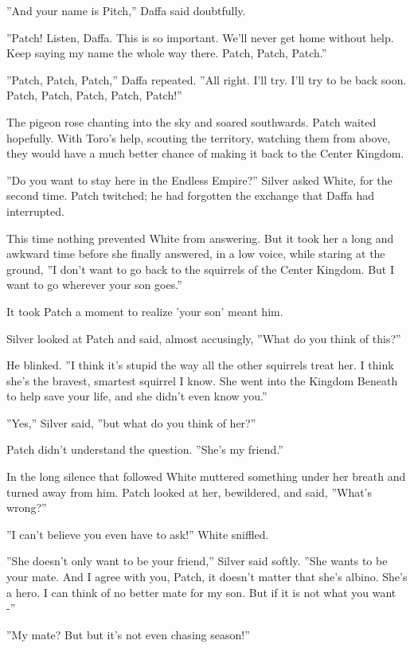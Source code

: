 \documentclass[12pt]{book}
\begin{document}
''And your name is Pitch,'' Daffa said doubtfully.\par
''Patch! Listen, Daffa. This is so important. We'll never get home without help. Keep saying my name the whole way there. Patch, Patch, Patch.''\par
''Patch, Patch, Patch,'' Daffa repeated. ''All right. I'll try. I'll try to be back soon. Patch, Patch, Patch, Patch, Patch!''\par
The pigeon rose chanting into the sky and soared southwards. Patch waited hopefully. With Toro's help, scouting the territory, watching them from above, they would have a much better chance of making it back to the Center Kingdom.\par
''Do you want to stay here in the Endless Empire?'' Silver asked White, for the second time. Patch twitched; he had forgotten the exchange that Daffa had interrupted.\par
 This time nothing prevented White from answering. But it took her a long and awkward time before she finally answered, in a low voice, while staring at the ground, ''I don't want to go back to the squirrels of the Center Kingdom. But I want to go wherever your son goes.''\par
 It took Patch a moment to realize 'your son' meant him.\par
 Silver looked at Patch and said, almost accusingly, ''What do you think of this?''\par
 He blinked. ''I think it's stupid the way all the other squirrels treat her. I think she's the bravest, smartest squirrel I know. She went into the Kingdom Beneath to help save your life, and she didn't even know you.''\par
 ''Yes,'' Silver said, ''but what do you think of her?''\par
 Patch didn't understand the question. ''She's my friend.''\par
 In the long silence that followed White muttered something under her breath and turned away from him. Patch looked at her, bewildered, and said, ''What's wrong?''\par
 ''I can't believe you even have to ask!'' White sniffled.\par
 ''She doesn't only want to be your friend,'' Silver said softly. ''She wants to be your mate. And I agree with you, Patch, it doesn't matter that she's albino. She's a hero. I can think of no better mate for my son. But if it is not what you want -''\par
 ''My mate? But %
 but it's not even chasing season!''\par
\end{document}
